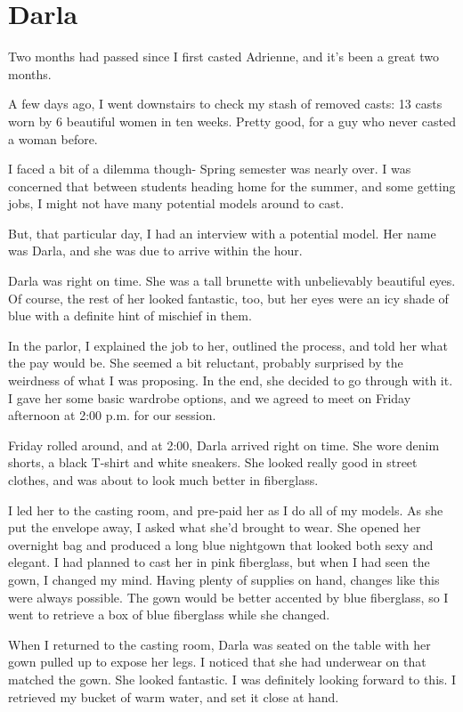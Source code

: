 \chapter{Darla}
Two months had passed since I first casted Adrienne, and it's been a great two months.

A few days ago, I went downstairs to check my stash of removed casts: 13 casts worn by 6
beautiful women in ten weeks. Pretty good, for a guy who never casted a woman before.

I faced a bit of a dilemma though- Spring semester was nearly over. I was concerned that
between students heading home for the summer, and some getting jobs, I might not have many
potential models around to cast.

But, that particular day, I had an interview with a potential model. Her name was Darla, and
she was due to arrive within the hour.

Darla was right on time. She was a tall brunette with unbelievably beautiful eyes. Of
course, the rest of her looked fantastic, too, but her eyes were an icy shade of blue with a
definite hint of mischief in them.

In the parlor, I explained the job to her, outlined the process, and told her what the pay
would be. She seemed a bit reluctant, probably surprised by the weirdness of what I was
proposing. In the end, she decided to go through with it. I gave her some basic wardrobe
options, and we agreed to meet on Friday afternoon at 2:00 p.m. for our session.

Friday rolled around, and at 2:00, Darla arrived right on time. She wore denim shorts, a
black T-shirt and white sneakers. She looked really good in street clothes, and was about to
look much better in fiberglass.

I led her to the casting room, and pre-paid her as I do all of my models. As she put the
envelope away, I asked what she'd brought to wear. She opened her overnight bag and produced a
long blue nightgown that looked both sexy and elegant. I had planned to cast her in pink
fiberglass, but when I had seen the gown, I changed my mind. Having plenty of supplies on hand,
changes like this were always possible. The gown would be better accented by blue fiberglass, so
I went to retrieve a box of blue fiberglass while she changed.

When I returned to the casting room, Darla was seated on the table with her gown pulled up
to expose her legs. I noticed that she had underwear on that matched the gown. She looked
fantastic. I was definitely looking forward to this. I retrieved my bucket of warm water, and
set it close at hand.

